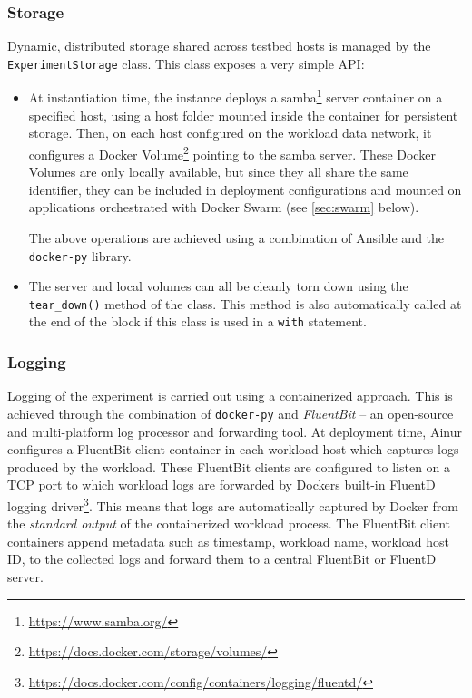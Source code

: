 \subsubsection{Storage}\label{sec:storage}

Dynamic, distributed storage shared across testbed hosts is managed by the \texttt{ExperimentStorage} class.
This class exposes a very simple \ac{API}:
\begin{itemize}
    \item At instantiation time, the instance deploys a samba\footnote{\url{https://www.samba.org/}} server container on a specified host, using a host folder mounted inside the container for persistent storage.
    Then, on each host configured on the workload data network, it configures a Docker Volume\footnote{\url{https://docs.docker.com/storage/volumes/}} pointing to the samba server.
    These Docker Volumes are only locally available, but since they all share the same identifier, they can be included in deployment configurations and mounted on applications orchestrated with Docker Swarm (see \cref{sec:swarm} below).

    The above operations are achieved using a combination of Ansible and the \texttt{docker-py} library.

    \item The server and local volumes can all be cleanly torn down using the \texttt{tear_down()} method of the class.
    This method is also automatically called at the end of the block if this class is used in a \texttt{with} statement.
\end{itemize}


\subsubsection{Logging}\label{sec:logging}

Logging of the experiment is carried out using a containerized approach.
This is achieved through the combination of \texttt{docker-py} and \textit{FluentBit} -- an open-source and multi-platform log processor and forwarding tool.
At deployment time, Ainur configures a FluentBit client container in each workload host which captures logs produced by the workload.
These FluentBit clients are configured to listen on a \ac{TCP} port to which workload logs are forwarded by Dockers built-in FluentD logging driver\footnote{\url{https://docs.docker.com/config/containers/logging/fluentd/}}.
This means that logs are automatically captured by Docker from the \emph{standard output} of the containerized workload process.
The FluentBit client containers append metadata such as timestamp, workload name, workload host ID, to the collected logs and forward them to a central FluentBit or FluentD server.

